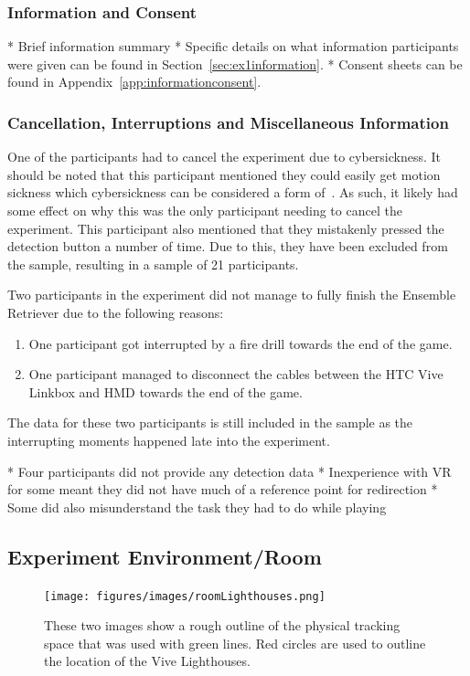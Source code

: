 \subsubsection{Information and Consent}
* Brief information summary
* Specific details on what information participants were given can be found in Section~\ref{sec:ex1information}.
* Consent sheets can be found in Appendix~\ref{app:informationconsent}.

\subsubsection{Cancellation, Interruptions and Miscellaneous Information}
One of the participants had to cancel the experiment due to cybersickness. It should be noted that this participant mentioned they could easily get motion sickness which cybersickness can be considered a form of~\cite{mousavi2013review}. As such, it likely had some effect on why this was the only participant needing to cancel the experiment. This participant also mentioned that they mistakenly pressed the detection button a number of time. Due to this, they have been excluded from the sample, resulting in a sample of 21 participants. 

Two participants in the experiment did not manage to fully finish the Ensemble Retriever due to the following reasons:
\begin{enumerate}
    \item One participant got interrupted by a fire drill towards the end of the game.
    \item One participant managed to disconnect the cables between the HTC Vive Linkbox and HMD towards the end of the game.
\end{enumerate}

The data for these two participants is still included in the sample as the interrupting moments happened late into the experiment. 

    * Four participants did not provide any detection data
      * Inexperience with VR for some meant they did not have much of a reference point for redirection
      * Some did also misunderstand the task they had to do while playing
     

\subsection{Experiment Environment/Room}
\begin{figure}[tbph]
    \centering
    \texttt{[image: figures/images/roomLighthouses.png]}
    \caption[Image of Experiment Environment]{These two images show a rough outline of the physical tracking space that was used with green lines. Red circles are used to outline the location of the Vive Lighthouses.}
    \label{fig:ex1room}
\end{figure}

